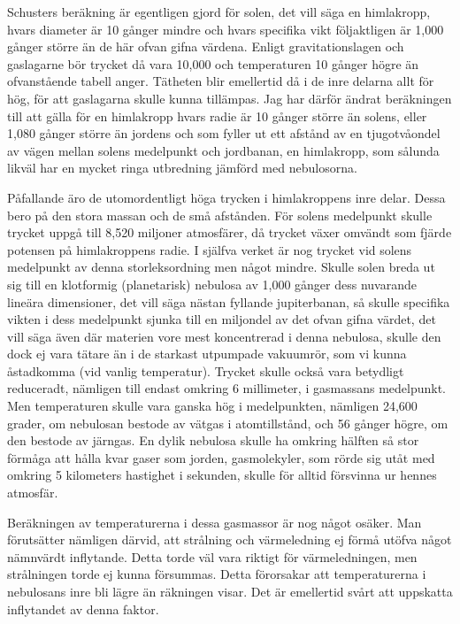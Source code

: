 \documentclass[a4paper, 12pt, oneside, swedish]{article}
\begin{document}
Schusters beräkning är egentligen gjord för solen, det vill säga en himlakropp, hvars diameter är 10 gånger mindre och hvars specifika vikt följaktligen är 1,000 gånger större än de här ofvan gifna värdena. Enligt gravitationslagen och gaslagarne bör trycket då vara 10,000 och temperaturen 10 gånger högre än ofvanstående tabell anger. Tätheten blir emellertid då i de inre delarna allt för hög, för att gaslagarna skulle kunna tillämpas. Jag har därför ändrat beräkningen till att gälla för en himlakropp hvars radie är 10 gånger större än solens, eller 1,080 gånger större än jordens och som fyller ut ett afstånd av en tjugotvåondel av vägen mellan solens medelpunkt och jordbanan, en himlakropp, som sålunda likväl har en mycket ringa utbredning jämförd med nebulosorna.

Påfallande äro de utomordentligt höga trycken i himlakroppens inre delar. Dessa bero på den stora massan och de små afstånden. För solens medelpunkt skulle trycket uppgå till 8,520 miljoner atmosfärer, då trycket växer omvändt som fjärde potensen på himlakroppens radie. I själfva verket är nog trycket vid solens medelpunkt av denna storleksordning men något mindre. Skulle solen breda ut sig till en klotformig (planetarisk) nebulosa av 1,000 gånger dess nuvarande lineära dimensioner, det vill säga nästan fyllande jupiterbanan, så skulle specifika vikten i dess medelpunkt sjunka till en miljondel av det ofvan gifna värdet, det vill säga även där materien vore mest koncentrerad i denna nebulosa, skulle den dock ej vara tätare än i de starkast utpumpade vakuumrör, som vi kunna åstadkomma (vid vanlig temperatur). Trycket skulle också vara betydligt reduceradt, nämligen till endast omkring 6 millimeter, i gasmassans medelpunkt. Men temperaturen skulle vara ganska hög i medelpunkten, nämligen 24,600 grader, om nebulosan bestode av vätgas i atomtillstånd, och 56 gånger högre, om den bestode av järngas. En dylik nebulosa skulle ha omkring hälften så stor förmåga att hålla kvar gaser som jorden, gasmolekyler, som rörde sig utåt med omkring 5 kilometers hastighet i sekunden, skulle för alltid försvinna ur hennes atmosfär.

Beräkningen av temperaturerna i dessa gasmassor är nog något osäker. Man förutsätter nämligen därvid, att strålning och värmeledning ej förmå utöfva något nämnvärdt inflytande. Detta torde väl vara riktigt för värmeledningen, men strålningen torde ej kunna försummas. Detta förorsakar att temperaturerna i nebulosans inre bli lägre än räkningen visar. Det är emellertid svårt att uppskatta inflytandet av denna faktor.
\end{document}
